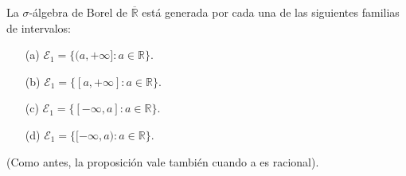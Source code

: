 \begin{prop}
    La $\sigma$-álgebra de Borel de $\overline{\mathbb{R}}$ está generada por cada una de las siguientes familias de intervalos:
    \begin{enumerate}
        \item[(a)] $\mathcal{E}_1 = \{ (a, +\infty] : a \in \mathbb{R}\}$.
        \item[(b)] $\mathcal{E}_1 = \{ [a, +\infty] : a \in \mathbb{R}\}$.
        \item[(c)] $\mathcal{E}_1 = \{ [-\infty, a] : a \in \mathbb{R}\}$.
        \item[(d)] $\mathcal{E}_1 = \{ [-\infty, a) : a \in \mathbb{R}\}$.
    \end{enumerate}
    (Como antes, la proposición vale también cuando a es racional).
\end{prop}
